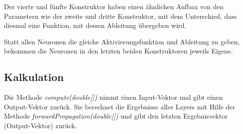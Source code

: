 \documentclass[paper=A4,pagesize=auto,12pt,headinclude=true,footinclude=true,BCOR=0mm,DIV=calc]{scrartcl}
\begin{document}
Der vierte und fünfte Konstruktor haben einen ähnlichen Aufbau von den Parametern wie der zweite und dritte Konstruktor, mit dem Unterschied, dass diesmal eine Funktion, mit dessen Ableitung übergeben wird.

Statt allen Neuronen die gleiche Aktivierungsfunktion und Ableitung zu geben, bekommen die Neuronen in den letzten beiden Konstruktoren jeweils Eigene.


\subsection{Kalkulation} %
Die Methode \textit{compute(double[])} nimmt einen Input-Vektor und gibt einen Output-Vektor zurück. Sie berechnet die Ergebnisse aller Layers mit Hilfe der Methode \textit{forwardPropagation(double[])} und gibt den letzten Ergebnisvektor (Output-Vektor) zurück.
\end{document}
